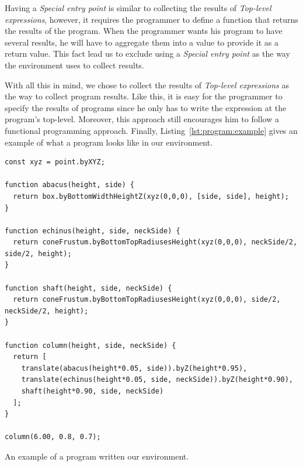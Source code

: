 Having a {\it Special entry point} is similar to collecting the results of {\it Top-level expressions}, however, it requires the programmer to define a function that returns the results of the program.
When the programmer wants his program to have several results, he will have to aggregate them into a value to provide it as a return value.
This fact lead us to exclude using a {\it Special entry point} as the way the environment uses to collect results.

With all this in mind, we chose to collect the results of {\it Top-level expressions} as the way to collect program results.
Like this, it is easy for the programmer to specify the results of programs since he only has to write the expression at the program's top-level.
Moreover, this approach still encourages him to follow a functional programming approach.
Finally, Listing~\ref{lst:program:example} gives an example of what a program looks like in our environment.

\begin{listing}
\begin{verbatim}
const xyz = point.byXYZ;

function abacus(height, side) {
  return box.byBottomWidthHeightZ(xyz(0,0,0), [side, side], height);
}

function echinus(height, side, neckSide) {
  return coneFrustum.byBottomTopRadiusesHeight(xyz(0,0,0), neckSide/2, side/2, height);
}

function shaft(height, side, neckSide) {
  return coneFrustum.byBottomTopRadiusesHeight(xyz(0,0,0), side/2, neckSide/2, height);
}

function column(height, side, neckSide) {
  return [
    translate(abacus(height*0.05, side)).byZ(height*0.95),
    translate(echinus(height*0.05, side, neckSide)).byZ(height*0.90),
    shaft(height*0.90, side, neckSide)
  ];
}

column(6.00, 0.8, 0.7);
\end{verbatim}
\caption{An example of a program written our environment.}
\label{lst:program:example}
\end{listing}


%


